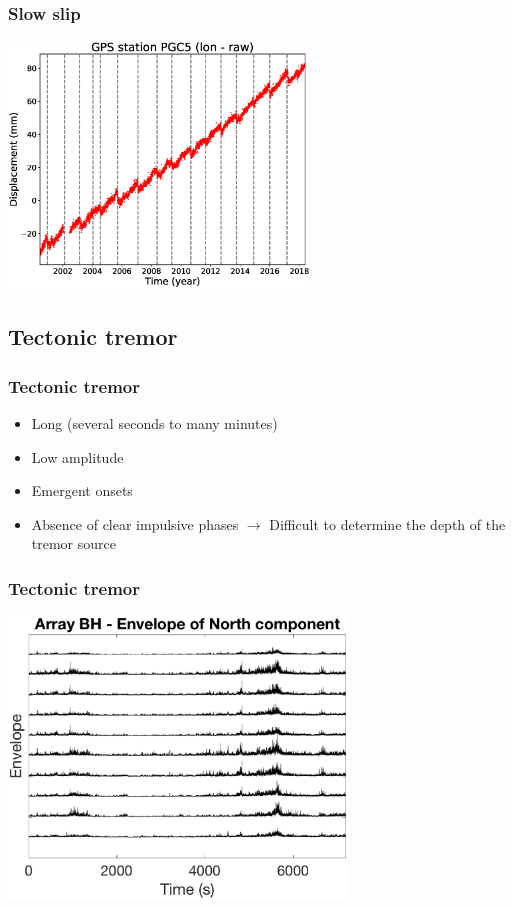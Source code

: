 \documentclass{beamer}
\begin{document}
	\begin{frame}
		\frametitle{Slow slip}
		\begin{center}
			\includegraphics[trim={0cm 0cm 0cm 0cm}, clip, width=8cm]{slowslip/slow_slip_GPS.eps}
		\end{center}
	\end{frame}


	\subsection{Tectonic tremor}

	\begin{frame}
		\frametitle{Tectonic tremor}
		\begin{itemize}
			\item Long (several seconds to many minutes)
			\item Low amplitude
			\item Emergent onsets
			\item Absence of clear impulsive phases $\rightarrow$ Difficult to determine the depth of the tremor source
		\end{itemize}
	\end{frame}

	\begin{frame}
		\frametitle{Tectonic tremor}
		\begin{center}
			\includegraphics[trim={0cm 0cm 0cm 0cm}, clip, width=9cm]{ETS/tremor.eps}
		\end{center}
	\end{frame}
\end{document}
